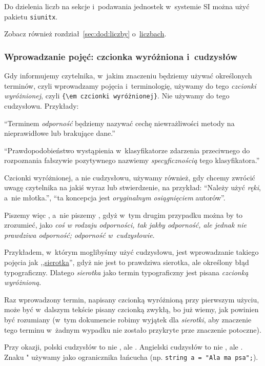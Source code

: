 Do dzielenia liczb na sekcje i~podawania jednostek w~systemie SI można użyć pakietu {\tt siunitx}.

Zobacz również rozdział~\ref{sec:dod:liczby} o~\hyperref[sec:dod:liczby]{liczbach}.


\subsubsection{Wprowadzanie pojęć: czcionka wyróżniona i~cudzysłów}
\label{sec:dod:pojecia-cudzyslowy}

Gdy informujemy czytelnika, w~jakim znaczeniu będziemy używać określonych terminów, czyli wprowadzamy pojęcia i~terminologię, używamy do tego {\em czcionki wyróżnionej}, czyli \verb+{\em czcionki wyróżnionej}+. Nie używamy do tego cudzysłowu. Przykłady:

``Terminem {\em odporność} będziemy nazywać cechę niewrażliwości metody na nieprawidłowe lub brakujące dane.''

``Prawdopodobieństwo wystąpienia w~klasyfikatorze zdarzenia przeciwnego do rozpoznania fałszywie pozytywnego nazwiemy {\em specyficznością} tego klasyfikatora.''

Czcionki wyróżnionej, a nie cudzysłowu, używamy również, gdy chcemy zwrócić uwagę czytelnika na jakiś wyraz lub stwierdzenie, na przykład: ``Należy użyć {\em ręki}, a~nie młotka.'', ``ta koncepcja jest {\em oryginalnym osiągnięciem} autorów''.

Piszemy więc , a~nie piszemy , gdyż w~tym drugim przypadku można by to zrozumieć, jako {\em coś w rodzaju odporności, tak jakby odporność, ale jednak nie prawdziwa odporność; odporność w~cudzysłowie}.

Przykładem, w~którym moglibyśmy użyć cudzysłowu, jest wprowadzanie takiego pojęcia jak ,,\hyperref[sec:dod:sierotki]{sierotka}'', gdyż nie jest to prawdziwa sierotka, ale określony błąd typograficzny. Dlatego {\em sierotka} jako termin typograficzny jest pisana {\em czcionką wyróżnioną}.

Raz wprowadzony termin, napisany czcionką wyróżnioną przy pierwszym użyciu, może być w~dalszym tekście pisany czcionką zwykłą, bo już wiemy, jak powinien być rozumiany (w~tym dokumencie robimy wyjątek dla {\em sierotki}, aby znaczenie tego terminu w~żadnym wypadku nie zostało przykryte prze znaczenie potoczne).

Przy okazji, polski cudzysłów to nie , ale . Angielski cudzysłów to nie , ale . Znaku " używamy jako ogranicznika łańcucha (np. {\tt string a = "Ala ma psa";}).



